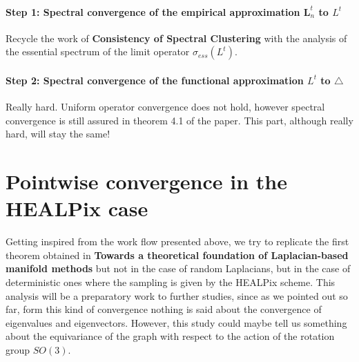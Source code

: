 \paragraph{Step 1: Spectral convergence of the empirical approximation $\mathbf{ L}_n^t$ to $L^t$}
Recycle the work of \textbf{Consistency of Spectral Clustering} with the analysis of the essential spectrum of the limit operator $\sigma_{ess}(L^t)$.
\paragraph{Step 2: Spectral convergence of the functional approximation $L^t$ to $\triangle$}
Really hard. Uniform operator convergence does not hold, however spectral convergence is still assured in theorem 4.1 of the paper. This part, although really hard, will stay the same!


\section{Pointwise convergence in the HEALPix case}

Getting inspired from the work flow presented above, we try to replicate the first theorem obtained in \textbf{Towards a theoretical foundation of Laplacian-based manifold methods} but not in the case of random Laplacians, but in the case of deterministic ones where the sampling is given by the HEALPix scheme. This analysis will be a preparatory work to further studies, since as we pointed out so far, form this kind of convergence nothing is said about the convergence of eigenvalues and eigenvectors. However, this study could maybe tell us something about the equivariance of the graph with respect to the action of the rotation group $SO(3)$.

